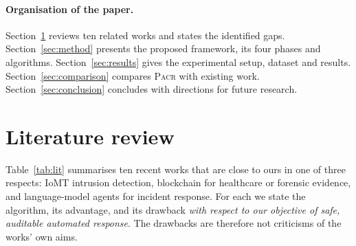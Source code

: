\documentclass[preprint,12pt]{elsarticle}
\newcommand{\pacr}{\textsc{Pacr}}
\begin{document}
\paragraph{Organisation of the paper.}
Section~\ref{sec:lit} reviews ten related works and states the identified gaps. Section~\ref{sec:method} presents the proposed framework, its four phases and algorithms. Section~\ref{sec:results} gives the experimental setup, dataset and results. Section~\ref{sec:comparison} compares \pacr{} with existing work. Section~\ref{sec:conclusion} concludes with directions for future research.

\section{Literature review}
\label{sec:lit}

Table~\ref{tab:lit} summarises ten recent works that are close to ours in one of three respects: IoMT intrusion detection, blockchain for healthcare or forensic evidence, and language-model agents for incident response. For each we state the algorithm, its advantage, and its drawback \emph{with respect to our objective of safe, auditable automated response}. The drawbacks are therefore not criticisms of the works' own aims.
\end{document}
